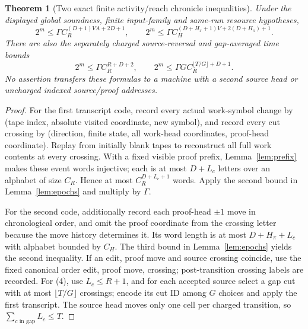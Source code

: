 \documentclass[11pt]{article}
\newtheorem{theorem}{Theorem}
\begin{document}
\begin{theorem}[Two exact finite activity/reach chronicle inequalities]\label{th:packing}
Under the displayed global soundness, finite input-family and same-run resource hypotheses,
\[
\boxed{2^m\le\Gamma C_R^{(D+1)VA+2D+1}},\qquad
\boxed{2^m\le\Gamma C_H^{(D+H_\pi+1)V+2(D+H_\pi)+1}}.
\tag{3}
\]
There are also the separately charged source-reversal and gap-averaged time bounds
\[
\boxed{2^m\le\Gamma C_R^{R+D+2}},\qquad
\boxed{2^m\le\Gamma G C_R^{\lfloor T/G\rfloor+D+1}}.
\tag{4}
\]
No assertion transfers these formulas to a machine with a second \emph{source} head or uncharged indexed source/proof addresses.
\end{theorem}
\begin{proof}
For the first transcript code, record every actual work-symbol change by (tape index, absolute visited coordinate, new symbol), and record every cut crossing by (direction, finite state, all work-head coordinates, proof-head coordinate). Replay from initially blank tapes to reconstruct all full work contents at every crossing. With a fixed visible proof prefix, Lemma~\ref{lem:prefix} makes these event words injective; each is at most $D+L_c$ letters over an alphabet of size $C_R$. Hence at most $C_R^{D+L_c+1}$ words. Apply the second bound in Lemma~\ref{lem:epochs} and multiply by $\Gamma$.

For the second code, additionally record each proof-head $\pm1$ move in chronological order, and omit the proof coordinate from the crossing letter because the move history determines it. Its word length is at most $D+H_\pi+L_c$ with alphabet bounded by $C_H$. The third bound in Lemma~\ref{lem:epochs} yields the second inequality. If an edit, proof move and source crossing coincide, use the fixed canonical order edit, proof move, crossing; post-transition crossing labels are recorded. For (4), use $L_c\le R+1$, and for each accepted source select a gap cut with at most $\lfloor T/G\rfloor$ crossings; encode its cut ID among $G$ choices and apply the first transcript. The source head moves only one cell per charged transition, so $\sum_{c\text{ in gap}}L_c\le T$.\end{proof}
\end{document}
